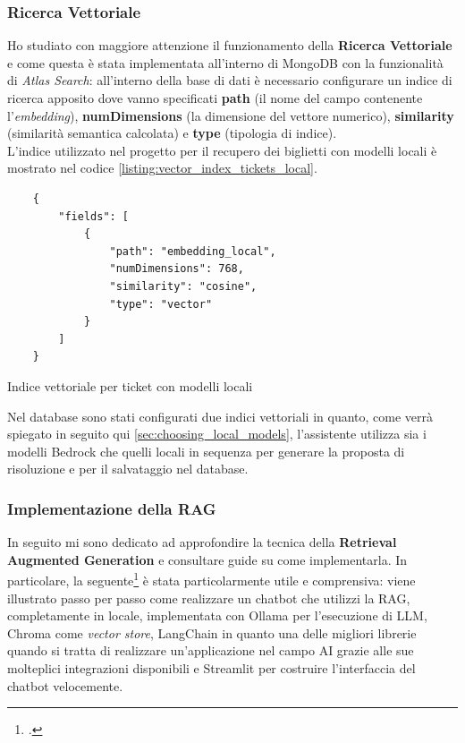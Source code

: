 \subsubsection*{Ricerca Vettoriale}
Ho studiato con maggiore attenzione il funzionamento della \textbf{Ricerca Vettoriale} e come questa è stata implementata all'interno di MongoDB con la funzionalità di \textit{Atlas Search}:
all'interno della base di dati è necessario configurare un indice di ricerca apposito dove vanno specificati \textbf{path} (il nome del campo contenente l'\textit{embedding}), \textbf{numDimensions} (la dimensione del vettore numerico), \textbf{similarity} (similarità semantica calcolata) e \textbf{type} (tipologia di indice). \\
L'indice utilizzato nel progetto per il recupero dei biglietti con modelli locali è mostrato nel codice \ref{listing:vector_index_tickets_local}.

\begin{listing}[H]
    \begin{verbatim}
    {
        "fields": [
            {
                "path": "embedding_local",
                "numDimensions": 768,
                "similarity": "cosine",
                "type": "vector"
            }
        ]
    }
    \end{verbatim}
    \caption{Indice vettoriale per ticket con modelli locali}
    \label{listing:vector_index_tickets_local}
\end{listing}

Nel database sono stati configurati due indici vettoriali in quanto, come verrà spiegato in seguito qui \ref{sec:choosing_local_models}, l'assistente utilizza sia i modelli Bedrock che quelli locali in sequenza per generare la proposta di risoluzione e per il salvataggio nel database.

\subsubsection*{Implementazione della RAG}

In seguito mi sono dedicato ad approfondire la tecnica della \textbf{Retrieval Augmented Generation} e consultare guide su come implementarla. 
In particolare, la seguente\footcite{site:rag-impl-guide} è stata particolarmente utile e comprensiva: viene illustrato passo per passo come realizzare un chatbot che utilizzi la RAG, completamente in locale,
implementata con Ollama per l'esecuzione di LLM, Chroma come \textit{vector store}, LangChain in quanto una delle migliori librerie quando si tratta di realizzare un'applicazione nel campo AI grazie alle sue molteplici integrazioni disponibili e Streamlit per costruire l'interfaccia del chatbot velocemente.\\

